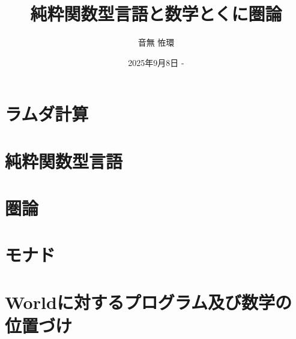 \documentclass[uplatex,dvipdfmx,a4paper]{jsbook}
\title{純粋関数型言語と数学とくに圏論}
\author{音無 恠環}
\date{2025年9月8日 - }
\begin{document}
    \maketitle

    \chapter{ラムダ計算}

    \chapter{純粋関数型言語}

    \chapter{圏論}

    \chapter{モナド}

    \chapter{Worldに対するプログラム及び数学の位置づけ}
\end{document}
